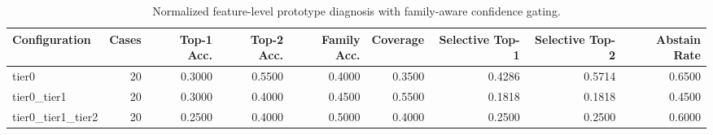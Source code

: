 \begin{table}[t]
\centering
\caption{Normalized feature-level prototype diagnosis with family-aware confidence gating.}
\label{tab:dice_stressor_hierarchical_diagnosis}
\footnotesize
\begin{tabular}{lrrrrrrrr}
\toprule
Configuration & Cases & Top-1 Acc. & Top-2 Acc. & Family Acc. & Coverage & Selective Top-1 & Selective Top-2 & Abstain Rate \\
\midrule
tier0 & 20 & 0.3000 & 0.5500 & 0.4000 & 0.3500 & 0.4286 & 0.5714 & 0.6500 \\
tier0_tier1 & 20 & 0.3000 & 0.4000 & 0.4500 & 0.5500 & 0.1818 & 0.1818 & 0.4500 \\
tier0_tier1_tier2 & 20 & 0.2500 & 0.4000 & 0.5000 & 0.4000 & 0.2500 & 0.2500 & 0.6000 \\
\bottomrule
\end{tabular}

\end{table}
